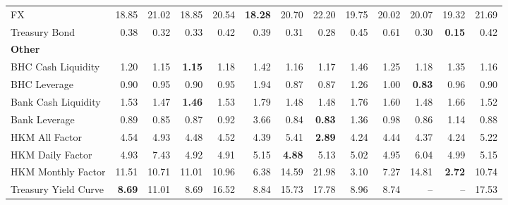 \begin{tabular}{@{}lrrrrrrrrrrrr@{}}
FX & 18.85 & 21.02 & 18.85 & 20.54 & \textbf{18.28} & 20.70 & 22.20 & 19.75 & 20.02 & 20.07 & 19.32 & 21.69 \\
Treasury Bond & 0.38 & 0.32 & 0.33 & 0.42 & 0.39 & 0.31 & 0.28 & 0.45 & 0.61 & 0.30 & \textbf{0.15} & 0.42 \\
\midrule
\multicolumn{13}{l}{\textbf{Other}} \\
BHC Cash Liquidity & 1.20 & 1.15 & \textbf{1.15} & 1.18 & 1.42 & 1.16 & 1.17 & 1.46 & 1.25 & 1.18 & 1.35 & 1.16 \\
BHC Leverage & 0.90 & 0.95 & 0.90 & 0.95 & 1.94 & 0.87 & 0.87 & 1.26 & 1.00 & \textbf{0.83} & 0.96 & 0.90 \\
Bank Cash Liquidity & 1.53 & 1.47 & \textbf{1.46} & 1.53 & 1.79 & 1.48 & 1.48 & 1.76 & 1.60 & 1.48 & 1.66 & 1.52 \\
Bank Leverage & 0.89 & 0.85 & 0.87 & 0.92 & 3.66 & 0.84 & \textbf{0.83} & 1.36 & 0.98 & 0.86 & 1.14 & 0.88 \\
HKM All Factor & 4.54 & 4.93 & 4.48 & 4.52 & 4.39 & 5.41 & \textbf{2.89} & 4.24 & 4.44 & 4.37 & 4.24 & 5.22 \\
HKM Daily Factor & 4.93 & 7.43 & 4.92 & 4.91 & 5.15 & \textbf{4.88} & 5.13 & 5.02 & 4.95 & 6.04 & 4.99 & 5.15 \\
HKM Monthly Factor & 11.51 & 10.71 & 11.01 & 10.96 & 6.38 & 14.59 & 21.98 & 3.10 & 7.27 & 14.81 & \textbf{2.72} & 10.74 \\
Treasury Yield Curve & \textbf{8.69} & 11.01 & 8.69 & 16.52 & 8.84 & 15.73 & 17.78 & 8.96 & 8.74 & -- & -- & 17.53 \\
\bottomrule
\end{tabular}